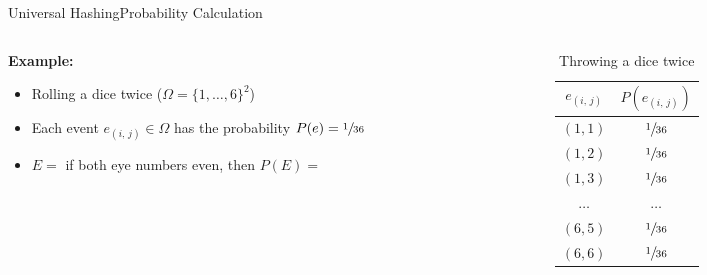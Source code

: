 \begin{frame}{Universal Hashing}{Probability Calculation}
  \begin{columns}
    \begin{column}{0.65\linewidth}
      \textbf{Example:}
      \begin{itemize}
        \item<2->
          Rolling a dice twice ({\color{Mittel-Blau}$\Omega = \{1,\dots,6\}^2$})
        \item<3->
          Each event {\color{Mittel-Blau}$e_{(i,\,j)} \in \Omega$} has the probability
          {\color{Mittel-Blau}$P(e) = \sfrac{1}{36}$}
        \item<4->
          {\color{Mittel-Blau}$E =$} if both eye numbers even, then {\color{Mittel-Blau}$P(E)=$}
      \end{itemize}
    \end{column}
    \begin{column}{0.35\linewidth}
      \begin{table}[!h]
        \caption{Throwing a dice twice}
        \label{tab:probabilities_rolling_dice_twice}
        \begin{tabularx}{0.8\linewidth}{c|c}
          {\color{Mittel-Blau}$e_{(i,\,j)}$} &{\color{Mittel-Blau} $P(e_{(i,\,j)})$}\\
          \midrule
          $(1, 1)$ & $\sfrac{1}{36}$\\
          $(1, 2)$ & $\sfrac{1}{36}$\\
          $(1, 3)$ & $\sfrac{1}{36}$\\
          $\dots$ & $\dots$\\
          $(6, 5)$ & $\sfrac{1}{36}$\\
          $(6, 6)$ & $\sfrac{1}{36}$\\
        \end{tabularx}
      \end{table}
    \end{column}
  \end{columns}
\end{frame}


